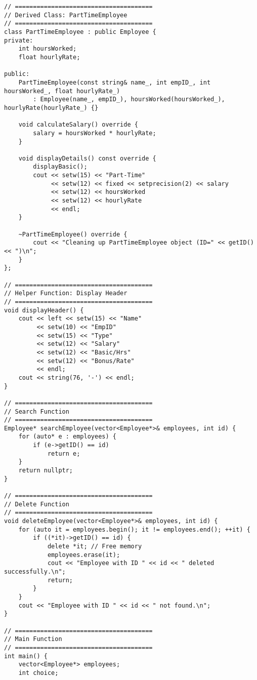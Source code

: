 \documentclass[12pt,a4paper]{article}
\begin{document}
\begin{lstlisting}
// ======================================
// Derived Class: PartTimeEmployee
// ======================================
class PartTimeEmployee : public Employee {
private:
    int hoursWorked;
    float hourlyRate;

public:
    PartTimeEmployee(const string& name_, int empID_, int hoursWorked_, float hourlyRate_)
        : Employee(name_, empID_), hoursWorked(hoursWorked_), hourlyRate(hourlyRate_) {}

    void calculateSalary() override {
        salary = hoursWorked * hourlyRate;
    }

    void displayDetails() const override {
        displayBasic();
        cout << setw(15) << "Part-Time"
             << setw(12) << fixed << setprecision(2) << salary
             << setw(12) << hoursWorked
             << setw(12) << hourlyRate
             << endl;
    }

    ~PartTimeEmployee() override {
        cout << "Cleaning up PartTimeEmployee object (ID=" << getID() << ")\n";
    }
};

// ======================================
// Helper Function: Display Header
// ======================================
void displayHeader() {
    cout << left << setw(15) << "Name"
         << setw(10) << "EmpID"
         << setw(15) << "Type"
         << setw(12) << "Salary"
         << setw(12) << "Basic/Hrs"
         << setw(12) << "Bonus/Rate"
         << endl;
    cout << string(76, '-') << endl;
}

// ======================================
// Search Function
// ======================================
Employee* searchEmployee(vector<Employee*>& employees, int id) {
    for (auto* e : employees) {
        if (e->getID() == id)
            return e;
    }
    return nullptr;
}

// ======================================
// Delete Function
// ======================================
void deleteEmployee(vector<Employee*>& employees, int id) {
    for (auto it = employees.begin(); it != employees.end(); ++it) {
        if ((*it)->getID() == id) {
            delete *it; // Free memory
            employees.erase(it);
            cout << "Employee with ID " << id << " deleted successfully.\n";
            return;
        }
    }
    cout << "Employee with ID " << id << " not found.\n";
}

// ======================================
// Main Function
// ======================================
int main() {
    vector<Employee*> employees;
    int choice;


\end{lstlisting}
\end{document}
